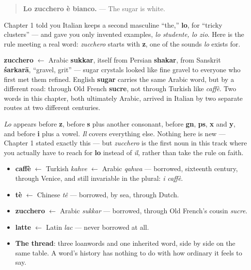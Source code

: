 \begin{quote}
\textbf{Lo zucchero è bianco.} — The sugar is white.
\end{quote}

Chapter 1 told you Italian keeps a second masculine \textquotedblleft{}the,\textquotedblright{} \textbf{lo}, for \textquotedblleft{}tricky clusters\textquotedblright{} — and gave you only invented examples, \emph{lo studente, lo zio}. Here is the rule meeting a real word: \emph{zucchero} starts with \textbf{z}, one of the sounds \emph{lo} exists for.

\begin{cousinweb}
\textbf{zucchero} $\leftarrow$ Arabic \textbf{sukkar}, itself from Persian \textbf{shakar}, from Sanskrit \textbf{śarkarā}, \textquotedblleft{}gravel, grit\textquotedblright{} — sugar crystals looked like fine gravel to everyone who first met them refined. English \textbf{sugar} carries the same Arabic word, but by a different road: through Old French \textbf{sucre}, not through Turkish like \emph{caffè}. Two words in this chapter, both ultimately Arabic, arrived in Italian by two separate routes at two different centuries.
\end{cousinweb}

\begin{grammarlens}[title={Grammar Lens: \emph{lo}, finally on a real word}]
\emph{Lo} appears before \textbf{z}, before \textbf{s} plus another consonant, before \textbf{gn}, \textbf{ps}, \textbf{x} and \textbf{y}, and before \textbf{i} plus a vowel. \emph{Il} covers everything else. Nothing here is new — Chapter 1 stated exactly this — but \emph{zucchero} is the first noun in this track where you actually have to reach for \textbf{lo} instead of \emph{il}, rather than take the rule on faith.
\end{grammarlens}

\begin{grammarlens}[title={What you've built this chapter}]
\begin{itemize}
\raggedright
  \item \textbf{caffè} $\leftarrow$ Turkish \emph{kahve} $\leftarrow$ Arabic \emph{qahwa} — borrowed, sixteenth century, through Venice, and still invariable in the plural: \emph{i caffè}.
  \item \textbf{tè} $\leftarrow$ Chinese \emph{tê} — borrowed, by sea, through Dutch.
  \item \textbf{zucchero} $\leftarrow$ Arabic \emph{sukkar} — borrowed, through Old French's cousin \emph{sucre}.
  \item \textbf{latte} $\leftarrow$ Latin \emph{lac} — never borrowed at all.
  \item \textbf{The thread}: three loanwords and one inherited word, side by side on the same table. A word's history has nothing to do with how ordinary it feels to say.
\end{itemize}
\end{grammarlens}

